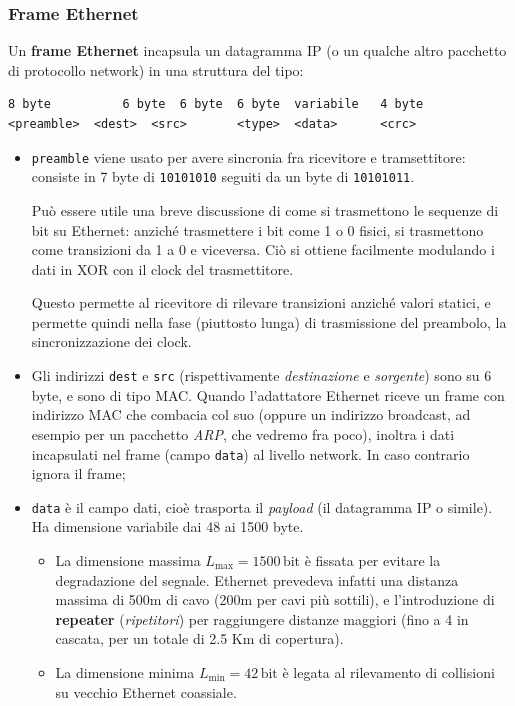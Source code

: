 \documentclass[a4paper,11pt]{article}
\begin{document}
\subsubsection{Frame Ethernet}
Un \textbf{frame Ethernet} incapsula un datagramma IP (o un qualche altro pacchetto di protocollo network) in una struttura del tipo:
\begin{lstlisting}[style=codestyle]
8 byte			6 byte	6 byte	6 byte	variabile	4 byte
<preamble>	<dest>	<src>		<type>	<data>		<crc>
\end{lstlisting}
\begin{itemize}
	\item \lstinline|preamble| viene usato per avere sincronia fra ricevitore e tramsettitore: consiste in 7 byte di \lstinline|10101010| seguiti da un byte di \lstinline|10101011|.

	Può essere utile una breve discussione di come si trasmettono le sequenze di bit su Ethernet: anziché trasmettere i bit come 1 o 0 fisici, si trasmettono come transizioni da 1 a 0 e viceversa. Ciò si ottiene facilmente modulando i dati in XOR con il clock del trasmettitore.

		Questo permette al ricevitore di rilevare transizioni anziché valori statici, e permette quindi nella fase (piuttosto lunga) di trasmissione del preambolo, la sincronizzazione dei clock.
		
	\item Gli indirizzi \lstinline|dest| e \lstinline|src| (rispettivamente \textit{destinazione} e \textit{sorgente}) sono su 6 byte, e sono di tipo MAC. Quando l'adattatore Ethernet riceve un frame con indirizzo MAC che combacia col suo (oppure un indirizzo broadcast, ad esempio per un pacchetto \textit{ARP}, che vedremo fra poco), inoltra i dati incapsulati nel frame (campo \lstinline|data|) al livello network. In caso contrario ignora il frame;
	\item \lstinline|data| è il campo dati, cioè trasporta il \textit{payload} (il datagramma IP o simile). Ha dimensione variabile dai 48 ai 1500 byte. 

		\begin{itemize}
			\item La dimensione massima $L_\text{max} = 1500 \, \text{bit}$ è fissata per evitare la degradazione del segnale. Ethernet prevedeva infatti una distanza massima di 500m di cavo (200m per cavi più sottili), e l'introduzione di \textbf{repeater} (\textit{ripetitori}) per raggiungere distanze maggiori (fino a 4 in cascata, per un totale di 2.5 Km di copertura).
			\item La dimensione minima $L_\text{min} = 42 \, \text{bit}$ è legata al rilevamento di collisioni su vecchio Ethernet coassiale.


\end{itemize}
\end{itemize}
\end{document}

